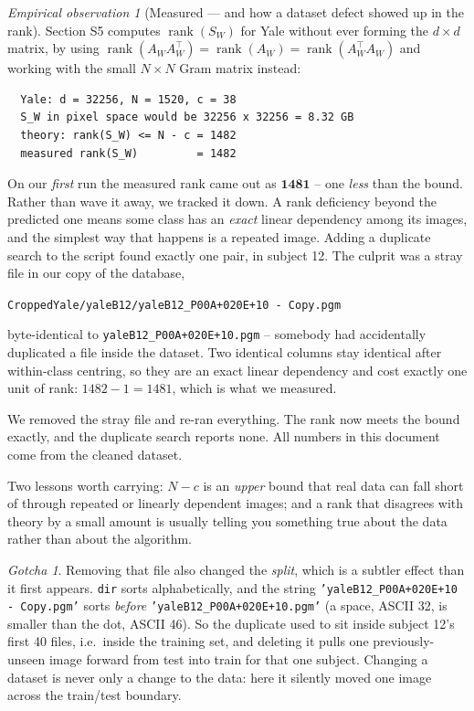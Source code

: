 \documentclass[11pt]{article}
\theoremstyle{definition}
\theoremstyle{remark}
\newtheorem*{gotcha}{Gotcha}
\newtheorem*{observation}{Empirical observation}
\newcommand{\Sw}{S_W}
\newcommand{\rank}{\operatorname{rank}}
\begin{document}
\begin{observation}[Measured --- and how a dataset defect showed up in the rank]
Section S5 computes $\rank(\Sw)$ for Yale without ever forming the $d\times d$
matrix, by using $\rank(A_WA_W^{\!\top})=\rank(A_W)=\rank(A_W^{\!\top} A_W)$ and
working with the small $N\times N$ Gram matrix instead:
\begin{lstlisting}
  Yale: d = 32256, N = 1520, c = 38
  S_W in pixel space would be 32256 x 32256 = 8.32 GB
  theory: rank(S_W) <= N - c = 1482
  measured rank(S_W)         = 1482
\end{lstlisting}

On our \emph{first} run the measured rank came out as $\mathbf{1481}$ -- one \emph{less}
than the bound. Rather than wave it away, we tracked it down. A rank deficiency
beyond the predicted one means some class has an \emph{exact} linear dependency
among its images, and the simplest way that happens is a repeated image. Adding a
duplicate search to the script found exactly one pair, in subject 12. The culprit
was a stray file in our copy of the database,
\begin{center}
\texttt{CroppedYale/yaleB12/yaleB12\_P00A+020E+10 - Copy.pgm}
\end{center}
byte-identical to \texttt{yaleB12\_P00A+020E+10.pgm} -- somebody had accidentally
duplicated a file inside the dataset. Two identical columns stay identical after
within-class centring, so they are an exact linear dependency and cost exactly one
unit of rank: $1482-1 = 1481$, which is what we measured.

We removed the stray file and re-ran everything. The rank now meets the bound
exactly, and the duplicate search reports none. All numbers in this document come
from the cleaned dataset.

Two lessons worth carrying: $N-c$ is an \emph{upper} bound that real data can fall
short of through repeated or linearly dependent images; and a rank that disagrees
with theory by a small amount is usually telling you something true about the data
rather than about the algorithm.
\end{observation}

\begin{gotcha}
Removing that file also changed the \emph{split}, which is a subtler effect than it
first appears. \texttt{dir} sorts alphabetically, and the string
\texttt{'yaleB12\_P00A+020E+10 - Copy.pgm'} sorts \emph{before}
\texttt{'yaleB12\_P00A+020E+10.pgm'} (a space, ASCII 32, is smaller than the dot,
ASCII 46). So the duplicate used to sit inside subject 12's first 40 files, i.e.\
inside the training set, and deleting it pulls one previously-unseen image forward
from test into train for that one subject. Changing a dataset is never only a
change to the data: here it silently moved one image across the train/test
boundary.
\end{gotcha}
\end{document}
